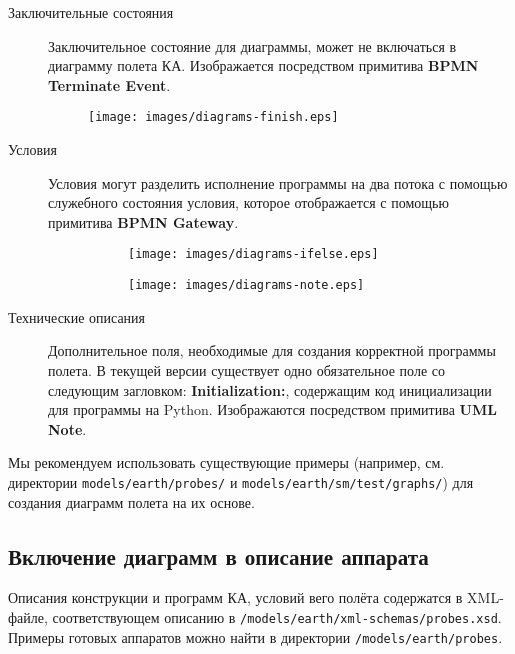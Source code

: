 \documentclass[12pt,a4paper]{article}
\begin{document}
\begin{description}
\item[Заключительные состояния] Заключительное состояние для диаграммы, может не
  включаться в диаграмму полета КА. Изображается посредством примитива \textbf{BPMN
    Terminate Event}.

\begin{figure}[h]
  \begin{center}
    \texttt{[image: images/diagrams-finish.eps]}
  \end{center}
\end{figure}

\item[Условия] Условия могут разделить исполнение программы на два потока с помощью
  служебного состояния условия, которое отображается с помощью примитива \textbf{BPMN
    Gateway}.
  
\begin{figure}[h]
  \begin{center}
    \begin{subfigure}{0.4\textwidth}
      \texttt{[image: images/diagrams-ifelse.eps]}
    \end{subfigure}
    \hfill
    \begin{subfigure}{0.4\textwidth}
      \texttt{[image: images/diagrams-note.eps]}
    \end{subfigure}
  \end{center}
\end{figure}

\item[Технические описания] Дополнительное поля, необходимые для создания корректной
  программы полета. В текущей версии существует одно обязательное поле со следующим
  загловком: \textbf{Initialization:}, содержащим код инициализации для программы на
  Python. Изображаются посредством примитива \textbf{UML Note}.

\end{description}

Мы рекомендуем использовать существующие примеры (например, см. директории
\verb'models/earth/probes/' и \verb'models/earth/sm/test/graphs/') для создания диаграмм
полета на их основе.

\subsection*{Включение диаграмм в описание аппарата}

Описания конструкции и программ КА, условий вего полёта содержатся в XML-файле,
соответствующем описанию в \verb'/models/earth/xml-schemas/probes.xsd'. Примеры готовых
аппаратов можно найти в директории \verb'/models/earth/probes'.
\end{document}
